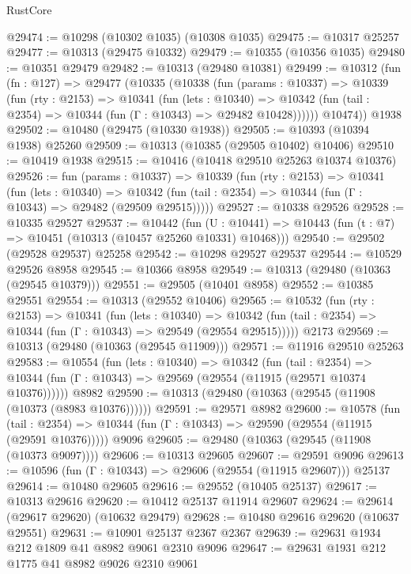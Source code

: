 \begin{lexlean}{RustCore}
\begin{coremodule}
@29474 := @10298 (@10302 @1035) (@10308 @1035)
@29475 := @10317 @25257
@29477 := @10313 (@29475 @10332)
@29479 := @10355 (@10356 @1035)
@29480 := @10351 @29479
@29482 := @10313 (@29480 @10381)
@29499 := @10312
    (fun (fn : @127) =>
    @29477
      (@10335
        (@10338
          (fun (params : @10337) =>
          @10339
            (fun (rty : @2153) =>
            @10341
              (fun (lets : @10340) =>
              @10342 (fun (tail : @2354) => @10344 (fun (Γ : @10343) => @29482 @10428))))))
        @10474))
    @1938
@29502 := @10480 (@29475 (@10330 @1938))
@29505 := @10393 (@10394 @1938) @25260
@29509 := @10313 (@10385 (@29505 @10402) @10406)
@29510 := @10419 @1938
@29515 := @10416 (@10418 @29510 @25263 @10374 @10376)
@29526 := fun (params : @10337) =>
  @10339
    (fun (rty : @2153) =>
    @10341
      (fun (lets : @10340) =>
      @10342 (fun (tail : @2354) => @10344 (fun (Γ : @10343) => @29482 (@29509 @29515)))))
@29527 := @10338 @29526
@29528 := @10335 @29527
@29537 := @10442
    (fun (U : @10441) => @10443 (fun (t : @7) => @10451 (@10313 (@10457 @25260 @10331) @10468)))
@29540 := @29502 (@29528 @29537) @25258
@29542 := @10298 @29527 @29537
@29544 := @10529 @29526 @8958
@29545 := @10366 @8958
@29549 := @10313 (@29480 (@10363 (@29545 @10379)))
@29551 := @29505 (@10401 @8958)
@29552 := @10385 @29551
@29554 := @10313 (@29552 @10406)
@29565 := @10532
    (fun (rty : @2153) =>
    @10341
      (fun (lets : @10340) =>
      @10342 (fun (tail : @2354) => @10344 (fun (Γ : @10343) => @29549 (@29554 @29515)))))
    @2173
@29569 := @10313 (@29480 (@10363 (@29545 @11909)))
@29571 := @11916 @29510 @25263
@29583 := @10554
    (fun (lets : @10340) =>
    @10342
      (fun (tail : @2354) =>
      @10344 (fun (Γ : @10343) => @29569 (@29554 (@11915 (@29571 @10374 @10376))))))
    @8982
@29590 := @10313 (@29480 (@10363 (@29545 (@11908 (@10373 (@8983 @10376))))))
@29591 := @29571 @8982
@29600 := @10578
    (fun (tail : @2354) => @10344 (fun (Γ : @10343) => @29590 (@29554 (@11915 (@29591 @10376)))))
    @9096
@29605 := @29480 (@10363 (@29545 (@11908 (@10373 @9097))))
@29606 := @10313 @29605
@29607 := @29591 @9096
@29613 := @10596 (fun (Γ : @10343) => @29606 (@29554 (@11915 @29607))) @25137
@29614 := @10480 @29605
@29616 := @29552 (@10405 @25137)
@29617 := @10313 @29616
@29620 := @10412 @25137 @11914 @29607
@29624 := @29614 (@29617 @29620) (@10632 @29479)
@29628 := @10480 @29616 @29620 (@10637 @29551)
@29631 := @10901 @25137 @2367 @2367
@29639 := @29631 @1934 @212 @1809 @41 @8982 @9061 @2310 @9096
@29647 := @29631 @1931 @212 @1775 @41 @8982 @9026 @2310 @9061

\end{coremodule}
\end{lexlean}
